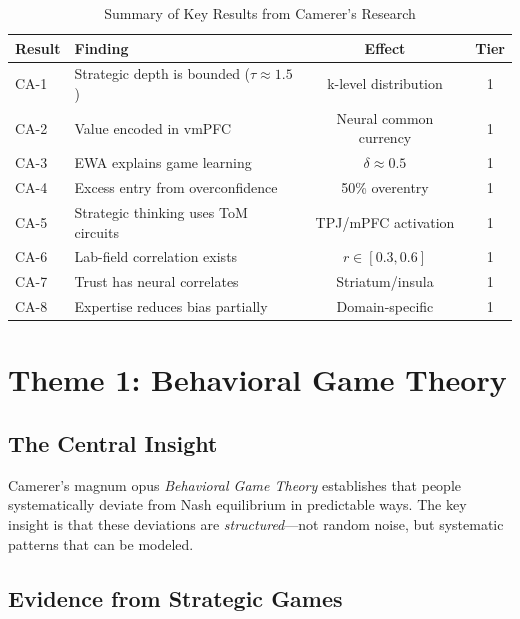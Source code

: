 \begin{table}[htbp]
\centering
\caption{Summary of Key Results from Camerer's Research}
\label{tab:ca-key-results}
\renewcommand{\arraystretch}{1.3}
\begin{tabular}{@{}llcc@{}}
\toprule
\textbf{Result} & \textbf{Finding} & \textbf{Effect} & \textbf{Tier} \\
\midrule
CA-1 & Strategic depth is bounded ($\tau \approx 1.5$) & k-level distribution & 1 \\
CA-2 & Value encoded in vmPFC & Neural common currency & 1 \\
CA-3 & EWA explains game learning & $\delta \approx 0.5$ & 1 \\
CA-4 & Excess entry from overconfidence & 50\% overentry & 1 \\
CA-5 & Strategic thinking uses ToM circuits & TPJ/mPFC activation & 1 \\
CA-6 & Lab-field correlation exists & $r \in [0.3, 0.6]$ & 1 \\
CA-7 & Trust has neural correlates & Striatum/insula & 1 \\
CA-8 & Expertise reduces bias partially & Domain-specific & 1 \\
\bottomrule
\end{tabular}
\end{table}


\section{Theme 1: Behavioral Game Theory}
\label{sec:ca-bgt}

\subsection{The Central Insight}

Camerer's magnum opus \textit{Behavioral Game Theory} \citep{PAP-PAP-camerer2003behavioralbehavioral} establishes that people systematically deviate from Nash equilibrium in predictable ways. The key insight is that these deviations are \textit{structured}---not random noise, but systematic patterns that can be modeled.

\subsection{Evidence from Strategic Games}

